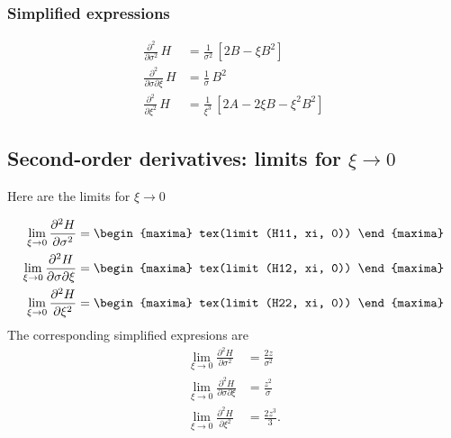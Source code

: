 \subsubsection*{Simplified  expressions}

{\color{red}
\begin{align*}
  \frac{\partial^2}{\partial \sigma^2} \,H
  &=  \frac{1}{\sigma^2}\, \left[2 B - \xi B^2 \right]\\
 \frac{\partial^2}{\partial \sigma \partial \xi} \, H 
  &=  \frac{1}{\sigma}\, B^2\\
    \frac{\partial^2}{\partial \xi^2} \, H 
  &= \frac{1}{\xi^3}\,\left[2 A - 2 \xi B - \xi^2 B ^2 \right]
\end{align*}
}



\subsection{Second-order derivatives: limits for $\xi \to 0$}

Here are the limits for $\xi \to 0$

{\color{MonVertF}
\begin{align*}
\lim_{\xi \to 0} \frac{\partial^2 H}{\partial \sigma^2} &=
\begin{maxima}
tex(limit (H11, xi, 0))
\end{maxima} \\
\lim_{\xi \to 0} \frac{\partial^2 H}{\partial \sigma \partial \xi} &=
\begin{maxima}
tex(limit (H12, xi, 0))
\end{maxima} \\
\lim_{\xi \to 0} \frac{\partial^2 H}{\partial \xi^2} &=
\begin{maxima}
tex(limit (H22, xi, 0))
\end{maxima}
\end{align*}}
The corresponding simplified expresions are
{\color{red}
\begin{align*}
  \lim_{\xi \to 0} \frac{\partial^2 H}{\partial \sigma^2}
  &= \frac{2z}{\sigma^2}\\
  \lim_{\xi \to 0} \frac{\partial^2 H}{\partial \sigma \partial \xi}
  &= \frac{z^2}{\sigma}\\
  \lim_{\xi \to 0} \frac{\partial^2 H}{\partial \xi^2}
    &= \frac{2 z^3}{3}.
\end{align*}
}






